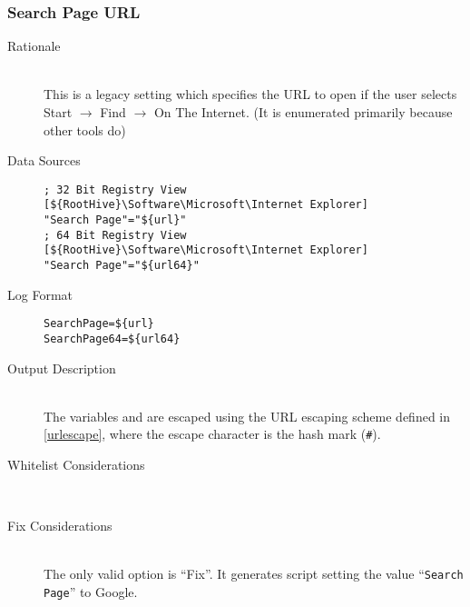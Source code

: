 \subsubsection{Search Page URL}
\begin{description}
\item[Rationale] \hfill \\ This is a legacy setting which specifies the URL to
open if the user selects Start $\rightarrow$ Find $\rightarrow$ On The Internet.
(It is enumerated primarily because other tools do)

\item[Data Sources] \hfill
\vspace{-\baselineskip}
\begin{verbatim}
; 32 Bit Registry View
[${RootHive}\Software\Microsoft\Internet Explorer]
"Search Page"="${url}"
; 64 Bit Registry View
[${RootHive}\Software\Microsoft\Internet Explorer]
"Search Page"="${url64}"
\end{verbatim}
\item[Log Format] \hfill
\vspace{-\baselineskip}
\begin{verbatim} 
SearchPage=${url}
SearchPage64=${url64}
\end{verbatim}
\item[Output Description] \hfill \\
The variables  and  are escaped using the URL escaping
scheme defined in \ref{urlescape}, where the escape character is the hash mark
(\verb|#|).
\item[Whitelist Considerations] \hfill \\

\item[Fix Considerations] \hfill \\
The only valid option is ``Fix''. It generates script setting the value
``\verb|Search Page|'' to Google.
\end{description}

